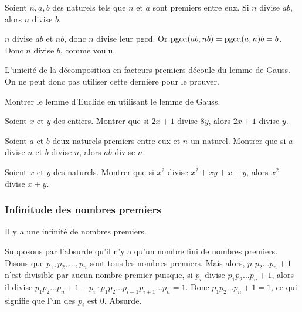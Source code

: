 \begin{thm}
Soient $n, a, b$ des naturels tels que $n$ et $a$ sont premiers entre eux. Si $n$ divise $ab$, alors $n$ divise $b$.
\end{thm}

\begin{preuve}
$n$ divise $ab$ et $nb$, donc $n$ divise leur pgcd. Or $\operatorname{\mathrm{pgcd}}(ab, nb) = \operatorname{\mathrm{pgcd}}(a, n)b = b$. Donc $n$ divise $b$, comme voulu.
\end{preuve}

\begin{rem}
L'unicité de la décomposition en facteurs premiers découle du lemme de Gauss. On ne peut donc pas utiliser cette dernière pour le prouver.
\end{rem}


\begin{exo}
Montrer le lemme d'Euclide en utilisant le lemme de Gauss.
\end{exo}


\begin{exo}
Soient $x$ et $y$ des entiers. Montrer que si $2x+1$ divise $8y$, alors $2x+1$ divise $y$.
\end{exo}


\begin{exo}
Soient $a$ et $b$ deux naturels premiers entre eux et $n$ un naturel. Montrer que si $a$ divise $n$ et $b$ divise $n$, alors $ab$ divise $n$.
\end{exo}


\begin{exo}
Soient $x$ et $y$ des naturels. Montrer que si $x^2$ divise $x^2 + xy + x + y$, alors $x^2$ divise $x+y$.
\end{exo}


\subsubsection{Infinitude des nombres premiers}


\begin{thm}
Il y a une infinité de nombres premiers.
\end{thm}

\begin{preuve}
Supposons par l'absurde qu'il n'y a qu'un nombre fini de nombres premiers. Disons que $p_1, p_2, \dots, p_n$ sont tous les nombres premiers. Mais alors, $p_1 p_2 \dots p_n + 1$ n'est divisible par aucun nombre premier puisque, si $p_i$ divise $p_1 p_2 \dots p_n + 1$, alors il divise $p_1 p_2 \dots p_n + 1 - p_i \cdot p_1 p_2 \dots p_{i-1} p_{i+1} \dots p_n = 1$. Donc $p_1 p_2 \dots p_n + 1 = 1$, ce qui signifie que l'un des $p_i$ est $0$. Absurde.
\end{preuve}


